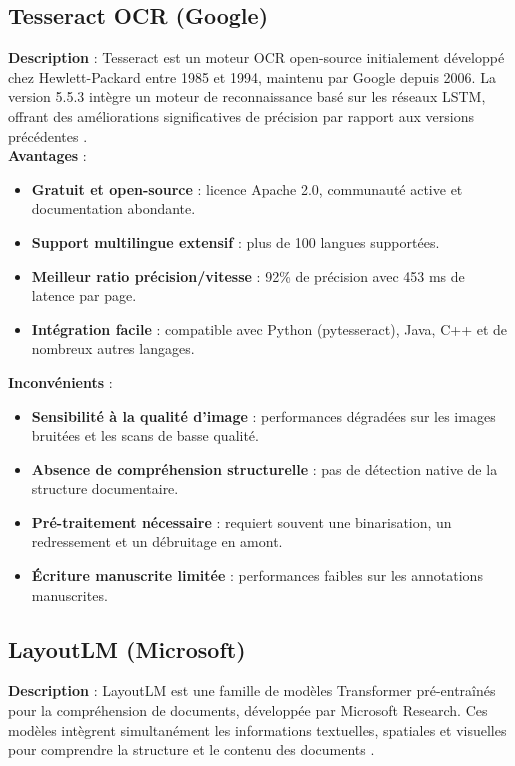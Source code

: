 \subsection{Tesseract OCR (Google)}
\textbf{Description} :
Tesseract est un moteur OCR open-source initialement développé chez Hewlett-Packard entre 1985 et 1994, maintenu par Google depuis 2006. La version 5.5.3 intègre un moteur de reconnaissance basé sur les réseaux LSTM, offrant des améliorations significatives de précision par rapport aux versions précédentes \cite{smith2007tesseract}.
\\
\textbf{Avantages} :
\begin{itemize}[label=, font=\large \color{darkgray}]
\item \textbf{Gratuit et open-source} : licence Apache 2.0, communauté active et documentation abondante.
\item \textbf{Support multilingue extensif} : plus de 100 langues supportées.
\item \textbf{Meilleur ratio précision/vitesse} : 92\% de précision avec 453 ms de latence par page.
\item \textbf{Intégration facile} : compatible avec Python (pytesseract), Java, C++ et de nombreux autres langages.
\end{itemize}

\textbf{Inconvénients} :
\begin{itemize}[label=, font=\large \color{darkgray}]
\item \textbf{Sensibilité à la qualité d'image} : performances dégradées sur les images bruitées et les scans de basse qualité.
\item \textbf{Absence de compréhension structurelle} : pas de détection native de la structure documentaire.
\item \textbf{Pré-traitement nécessaire} : requiert souvent une binarisation, un redressement et un débruitage en amont.
\item \textbf{Écriture manuscrite limitée} : performances faibles sur les annotations manuscrites.
\end{itemize}


\subsection{LayoutLM (Microsoft)}
\textbf{Description} :
LayoutLM est une famille de modèles Transformer pré-entraînés pour la compréhension de documents, développée par Microsoft Research. Ces modèles intègrent simultanément les informations textuelles, spatiales et visuelles pour comprendre la structure et le contenu des documents \cite{xu2020layoutlm, xu2021layoutlmv2, huang2022layoutlmv3}.


